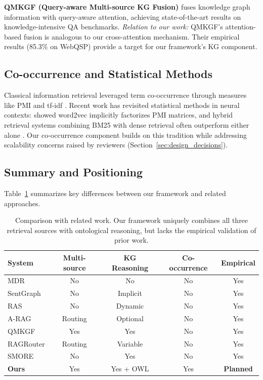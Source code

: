 \documentclass[11pt,a4paper]{article}
\begin{document}
\textbf{QMKGF (Query-aware Multi-source KG Fusion)} \citep{qmkgf2024} fuses knowledge graph information with query-aware attention, achieving state-of-the-art results on knowledge-intensive QA benchmarks. \textit{Relation to our work:} QMKGF's attention-based fusion is analogous to our cross-attention mechanism. Their empirical results (85.3\% on WebQSP) provide a target for our framework's KG component.

\subsection{Co-occurrence and Statistical Methods}

Classical information retrieval leveraged term co-occurrence through measures like PMI and tf-idf \citep{manning2008introduction}. Recent work has revisited statistical methods in neural contexts: \citet{levy2014neural} showed word2vec implicitly factorizes PMI matrices, and hybrid retrieval systems combining BM25 with dense retrieval often outperform either alone \citep{ma2023hybrid}. Our co-occurrence component builds on this tradition while addressing scalability concerns raised by reviewers (Section~\ref{sec:design_decisions}).

\subsection{Summary and Positioning}

Table~\ref{tab:related_work} summarizes key differences between our framework and related approaches.

\begin{table}[h]
\centering
\small
\begin{tabular}{lcccc}
\toprule
\textbf{System} & \textbf{Multi-source} & \textbf{KG Reasoning} & \textbf{Co-occurrence} & \textbf{Empirical} \\
\midrule
MDR & No & No & No & Yes \\
SentGraph & No & Implicit & No & Yes \\
RAS & No & Dynamic & No & Yes \\
A-RAG & Routing & Optional & No & Yes \\
QMKGF & Yes & Yes & No & Yes \\
RAGRouter & Routing & Variable & No & Yes \\
SMORE & No & Yes & No & Yes \\
\midrule
\textbf{Ours} & Yes & Yes + OWL & Yes & \textbf{Planned} \\
\bottomrule
\end{tabular}
\caption{Comparison with related work. Our framework uniquely combines all three retrieval sources with ontological reasoning, but lacks the empirical validation of prior work.}
\label{tab:related_work}
\end{table}
\end{document}
